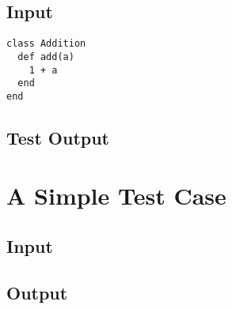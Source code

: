\subsection{Input}
\begin{lstlisting}
class Addition
  def add(a)
    1 + a
  end
end
\end{lstlisting}

\subsection{Test Output}


\section{A Simple Test Case}
\subsection{Input}


\subsection{Output}



